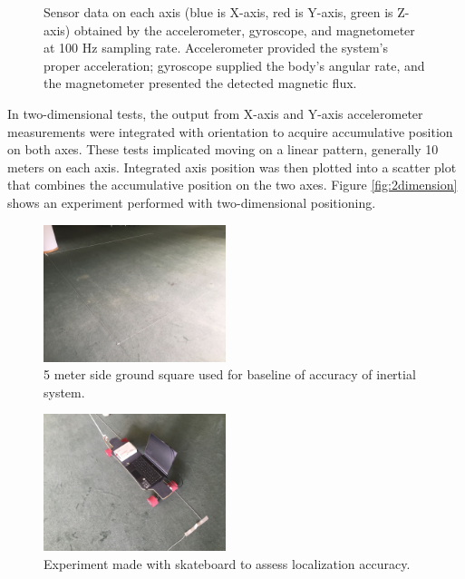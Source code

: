 \begin{figure}
    \centering
    \resizebox{1\linewidth}{!}{}
    \caption{Sensor data on each axis (blue is X-axis, red is Y-axis, green is Z-axis) obtained by the accelerometer, gyroscope, and magnetometer at 100 Hz sampling rate. Accelerometer provided the system’s proper acceleration; gyroscope supplied the body’s angular rate, and the magnetometer presented the detected magnetic flux.}
\end{figure}

In two-dimensional tests, the output from X-axis and Y-axis accelerometer measurements were integrated with orientation to acquire accumulative position on both axes. These tests implicated moving on a linear pattern, generally 10 meters on each axis. Integrated axis position was then plotted into a scatter plot that combines the accumulative position on the two axes. Figure \ref{fig:2dimension} shows an experiment performed with two-dimensional positioning.

\begin{figure}[!h]
    \centering
    \includegraphics[width=0.475\textwidth]{figures/experiment2.jpg}
    \caption{ 5 meter side ground square used for baseline of accuracy of inertial system. }
    \label{fig:full}
\end{figure}

\begin{figure}[!h]
    \centering
    \includegraphics[width=0.475\textwidth]{figures/experiment3.jpg}
    \caption{ Experiment made with skateboard to assess localization accuracy. }
    \label{fig:full}
\end{figure}

